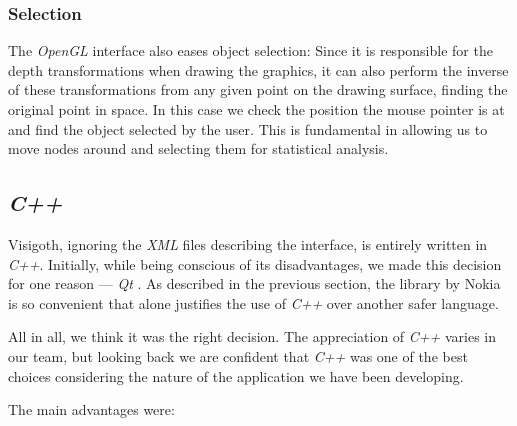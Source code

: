 \documentclass[a4paper,11pt,titlepage]{article}
\newcommand{\buzz}[1]{\emph{#1}}
\newcommand{\Qt}{\buzz{Qt} }
\newcommand{\OpenGL}{\buzz{OpenGL} }
\begin{document}
\subsubsection{Selection}
The \OpenGL interface also eases object selection: Since it is
responsible for the depth transformations when drawing the graphics,
it can also perform the inverse of these transformations from any
given point on the drawing surface, finding the original point in
space. In this case we check the position the mouse pointer is at and
find the object selected by the user. This is fundamental in allowing
us to move nodes around and selecting them for statistical analysis.

\subsection{\buzz{C++}}

Visigoth, ignoring the \buzz{XML} files describing the interface, is
entirely written in \buzz{C++}. Initially, while being conscious of
its disadvantages, we made this decision for one reason ---
\buzz{\Qt}. As described in the previous section, the library by Nokia
is so convenient that alone justifies the use of \buzz{C++} over
another safer language.

All in all, we think it was the right decision. The appreciation of
\buzz{C++} varies in our team, but looking back we are confident that
\buzz{C++} was one of the best choices considering the nature of the
application we have been developing.

The main advantages were:
\end{document}

